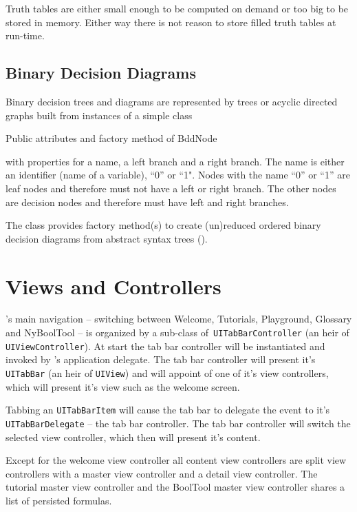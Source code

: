 Truth tables are either small enough to be computed on demand or too big to be stored in memory.
Either way there is not reason to store filled truth tables at run-time.

\subsection{Binary Decision Diagrams}

Binary decision trees and diagrams are represented by trees or acyclic directed graphs built from instances of a simple class
\begin{table}[htdp]
\begin{center}
\caption{Public attributes and factory method of BddNode}
\label{fig:BddNode}
\end{center}
\end{table}
 with properties for a name, a left branch and a right branch. The name is either an identifier (name of a variable), “0” or “1". 
Nodes with the name “0” or “1” are leaf nodes and therefore must not have a left or right branch.
The other nodes are decision nodes and therefore must have left and right branches. 

The class provides factory method(s) to create 
(un)reduced ordered binary decision diagrams from abstract syntax trees
().




\section{Views and Controllers}

\Nyaya's main navigation – switching between Welcome, Tutorials, Playground, Glossary and NyBoolTool – 
is organized by a sub-class of\verb+ UITabBarController+ (an heir of \verb+UIViewController+). 
At start the tab bar controller will be instantiated and invoked by \Nyaya's application delegate. 
The tab bar controller will present it's \verb+UITabBar+ (an heir of \verb+UIView+)
and will appoint of one of it's view controllers, which will present it's view such as the welcome screen.

Tabbing an \verb+UITabBarItem+ will cause the tab bar to delegate the event to it's \verb+UITabBarDelegate+ – the tab bar controller.
The tab bar controller will switch the selected view controller, which then will present it's content.

Except for the welcome view controller 
all content view controllers are split view controllers 
with a master view controller and a detail view controller.
The tutorial master view controller and the BoolTool master view controller shares a list of persisted formulas.

